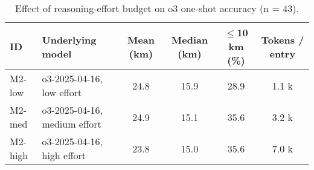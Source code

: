 \begin{table*}[tbp]
  \centering\footnotesize
  \caption{Effect of reasoning-effort budget on o3 one-shot accuracy (n = 43).}%
  \label{tbl:reasoning}
  \begin{tabular}{l p{} c c c c}
    \toprule
    ID & Underlying model & Mean (km) & Median (km) & $\le$10 km (\%) & Tokens / entry\\
    \midrule
    M2-low  & o3-2025-04-16, low effort    & 24.8 & 15.9 & 28.9 & 1.1 k\\
    M2-med  & o3-2025-04-16, medium effort & 24.9 & 15.1 & 35.6 & 3.2 k\\
    M2-high & o3-2025-04-16, high effort   & 23.8 & 15.0 & 35.6 & 7.0 k\\
    \bottomrule
  \end{tabular}
\end{table*}
